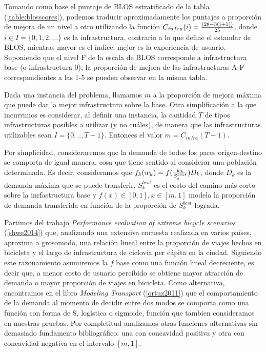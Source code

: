 \documentclass{article}
\begin{document}
  Tomando como base el puntaje de BLOS estratificado de la tabla (\ref{table:blosscores}), podemos traducir aproximadamente los puntajes a proporción de mejora de un nivel a otro utilizando la función $C_{infra}(i) = {(28 - 3 (i + 1)) \over 25}$, donde $i \in I = \{0,1,2,\ldots\}$ es la infrastructura, contrario a lo que define el estandar de BLOS, mientras mayor es el índice, mejor es la experiencia de usuario. Suponiendo que el nivel F de la escala de BLOS corresponde a infrastructura base (o infrastructura 0), la proporción de mejora de las infrastructuras A-F correspondientes a las 1-5 se pueden observar en la misma tabla.

  Dada una instancia del problema, llamamos $m$ a la proporción de mejora máxima que puede dar la mejor infrastructura sobre la base. Otra simplificación a la que incurrimos es considerar, al definir una instancia, la cantidad $T$ de tipos infrastructuras posibles a utilizar (y no cuáles), de manera que las infrastructuras utilizables sean $I = \{0,.., T - 1\}$. Entonces el valor $m = C_{infra}(T - 1)$.

  Por simplicidad, consideraremos que la demanda de todos los pares origen-destino se comporta de igual manera, cosa que tiene sentido al considerar una población determinada. Es decir, consideramos que $f_k(w_k) = f({w_k \over S^{best}_k})D_k$, donde $D_k$ es la demanda máxima que se puede transferir, $S^{best}_k$ es el costo del camino más corto sobre la inrfastructura base y $f(x) \in [0, 1], x \in [m, 1]$ modela la proporción de demanda transferida en función de la proporción de $S^{best}_k$ lograda.

  Partimos del trabajo {\it Performance evaluation of extreme bicycle scenarios} (\ref{shwe2014}) que, analizando una extensiva encuesta realizada en varios países, aproxima a grosomodo, una relación lineal entre la proporción de viajes hechos en bicicleta y el largo de infrastructura de ciclovía per cápita en la ciudad. Siguiendo este razonamiento asumiremos la $f$ base como una función lineal decreciente, es decir que, a menor costo de usuario percibido se obtiene mayor atracción de demanda o mayor proporción de viajes en bicicleta. Como alternativa, encontramos en el libro {\it Modeling Transport} (\ref{ortuz2011}) que el comportamiento de la demanda al momento de decidir entre dos modos se comporta como una función con forma de S, logística o sigmoide, función que tambien consideramos en nuestras pruebas. Por completitud analizamos otras funciones alternativas sin demasiado fundamento bibliográfico: una con concavidad positiva y otra con concavidad negativa en el intervalo $[m, 1]$.
\end{document}
